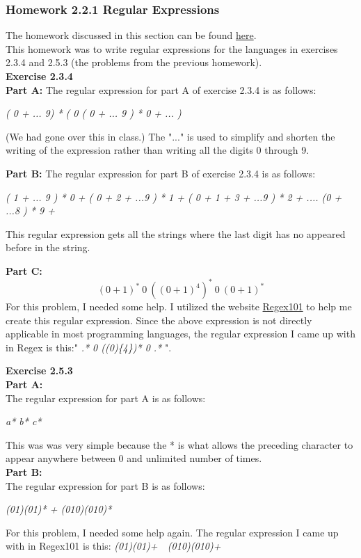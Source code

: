 \documentclass{article}
\theoremstyle{theorem}
\theoremstyle{definition}
\theoremstyle{remark}
\begin{document}
\subsubsection{Homework 2.2.1 Regular Expressions}
The homework discussed in this section can be found \href{https://hackmd.io/@alexhkurz/S1EVYe7bO}{here}.\\
This homework was to write regular expressions for the languages in exercises 2.3.4 and 2.5.3 (the problems from the previous homework).\\
\textbf{Exercise 2.3.4}\\
\textbf{Part A:}
The regular expression for part A of exercise 2.3.4 is as follows:
\begin{center}
    \textit{( 0 + ... 9) * ( 0 ( 0 + ... 9 ) * 0 + ... )}
\end{center}
(We had gone over this in class.) The "..." is used to simplify and shorten the writing of the expression rather than writing all the digits 0 through 9.

\textbf{Part B:}
The regular expression for part B of exercise 2.3.4 is as follows:
\begin{center}
    \textit{( 1 + ... 9 ) * 0  + ( 0 + 2 + ...9 ) * 1 + ( 0 + 1 + 3 + ...9 ) * 2 + .... (0 + ...8 ) * 9 + \textepsilon }
\end{center}
This regular expression gets all the strings where the last digit has no appeared before in the string.

\textbf{Part C:}
\begin{equation}
    (0+1)^*\ 0\ ((0+1)^4)^*\ 0\ (0+1)^*
\end{equation}
For this problem, I needed some help. I utilized the website \href{https://regex101.com/}{Regex101} to help me create this regular expression. Since the above expression is not directly applicable in most programming languages, the regular expression I came up with in Regex is this:" \textit{.* 0 ((0)\{4\})* 0 .*} ".

\textbf{Exercise 2.5.3}\\
\textbf{Part A:}\\
The regular expression for part A is as follows:
\begin{center}
   \textit{a* b* c*}
\end{center}
This was was very simple because the * is what allows the preceding character to appear anywhere between 0 and unlimited number of times.\\

\textbf{Part B:}\\
The regular expression for part B is as follows:
\begin{center}
    \textit{(01)(01)* + (010)(010)*}
\end{center}
For this problem, I needed some help again. The regular expression I came up with in Regex101 is this: \textit{(01)(01)+\ \textpipe\ (010)(010)+}\\
\end{document}

